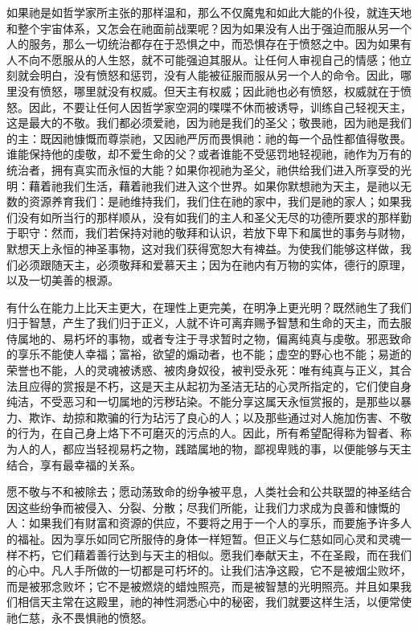 如果祂是如哲学家所主张的那样温和，那么不仅魔鬼和如此大能的仆役，就连天地和整个宇宙体系，又怎会在祂面前战栗呢？因为如果没有人出于强迫而服从另一个人的服务，那么一切统治都存在于恐惧之中，而恐惧存在于愤怒之中。因为如果有人不向不愿服从的人生怒，就不可能强迫其服从。让任何人审视自己的情感；他立刻就会明白，没有愤怒和惩罚，没有人能被征服而服从另一个人的命令。因此，哪里没有愤怒，哪里就没有权威。但天主有权威；因此祂也必有愤怒，权威就在于愤怒。因此，不要让任何人因哲学家空洞的喋喋不休而被诱导，训练自己轻视天主，这是最大的不敬。我们都必须爱祂，因为祂是我们的圣父；敬畏祂，因为祂是我们的主：既因祂慷慨而尊崇祂，又因祂严厉而畏惧祂：祂的每一个品性都值得敬畏。谁能保持他的虔敬，却不爱生命的父？或者谁能不受惩罚地轻视祂，祂作为万有的统治者，拥有真实而永恒的大能？如果你视祂为圣父，祂供给我们进入所享受的光明：藉着祂我们生活，藉着祂我们进入这个世界。如果你默想祂为天主，是祂以无数的资源养育我们：是祂维持我们，我们住在祂的家中，我们是祂的家人；如果我们没有如所当行的那样顺从，没有如我们的主人和圣父无尽的功德所要求的那样勤于职守：然而，我们若保持对祂的敬拜和认识，若放下卑下和属世的事务与财物，默想天上永恒的神圣事物，这对我们获得宽恕大有裨益。为使我们能够这样做，我们必须跟随天主，必须敬拜和爱慕天主；因为在祂内有万物的实体，德行的原理，以及一切美善的根源。\par

有什么在能力上比天主更大，在理性上更完美，在明净上更光明？既然祂生了我们归于智慧，产生了我们归于正义，人就不许可离弃赐予智慧和生命的天主，而去服侍属地的、易朽坏的事物，或者专注于寻求暂时之物，偏离纯真与虔敬。邪恶致命的享乐不能使人幸福；富裕，欲望的煽动者，也不能；虚空的野心也不能；易逝的荣誉也不能，人的灵魂被诱惑、被肉身奴役，被判受永死：唯有纯真与正义，其合法且应得的赏报是不朽，这是天主从起初为圣洁无玷的心灵所指定的，它们使自身纯洁，不受恶习和一切属地的污秽玷染。不能分享这属天永恒赏报的，是那些以暴力、欺诈、劫掠和欺骗的行为玷污了良心的人；以及那些通过对人施加伤害、不敬的行为，在自己身上烙下不可磨灭的污点的人。因此，所有希望配得称为智者、称为人的人，都应当轻视易朽之物，践踏属地的物，鄙视卑贱的事，以便能够与天主结合，享有最幸福的关系。\par

愿不敬与不和被除去；愿动荡致命的纷争被平息，人类社会和公共联盟的神圣结合因这些纷争而被侵入、分裂、分散；尽我们所能，让我们力求成为良善和慷慨的人：如果我们有财富和资源的供应，不要将之用于一个人的享乐，而要施予许多人的福祉。因为享乐如同它所服侍的身体一样短暂。但正义与仁慈如同心灵和灵魂一样不朽，它们藉着善行达到与天主的相似。愿我们奉献天主，不在圣殿，而在我们的心中。凡人手所做的一切都是可朽坏的。让我们洁净这殿，它不是被烟尘败坏，而是被邪念败坏；它不是被燃烧的蜡烛照亮，而是被智慧的光明照亮。并且如果我们相信天主常在这殿里，祂的神性洞悉心中的秘密，我们就要这样生活，以便常使祂仁慈，永不畏惧祂的愤怒。\par

